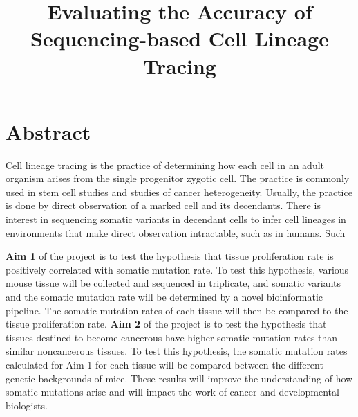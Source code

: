 \documentclass[12pt]{article}
\title{Evaluating the Accuracy of Sequencing-based Cell Lineage Tracing}
\date{}
\begin{document}
\maketitle





\section{Abstract}

Cell lineage tracing is the practice of determining how each cell in an adult organism arises from the single progenitor zygotic cell.
The practice is commonly used in stem cell studies and studies of cancer heterogeneity.
Usually, the practice is done by direct observation of a marked cell and its decendants.
There is interest in sequencing somatic variants in decendant cells to infer cell lineages in environments that make direct observation intractable, such as in humans.
Such 

\textbf{Aim 1} of the project is to test the hypothesis that tissue proliferation rate is positively correlated with somatic mutation rate.
To test this hypothesis, various mouse tissue will be collected and sequenced in triplicate, and somatic variants and the somatic mutation rate will be determined by a novel bioinformatic pipeline.
The somatic mutation rates of each tissue will then be compared to the tissue proliferation rate.
\textbf{Aim 2} of the project is to test the hypothesis that tissues destined to become cancerous have higher somatic mutation rates than similar noncancerous tissues.
To test this hypothesis, the somatic mutation rates calculated for Aim 1 for each tissue will be compared between the different genetic backgrounds of mice.
These results will improve the understanding of how somatic mutations arise and will impact the work of cancer and developmental biologists.
\end{document}

